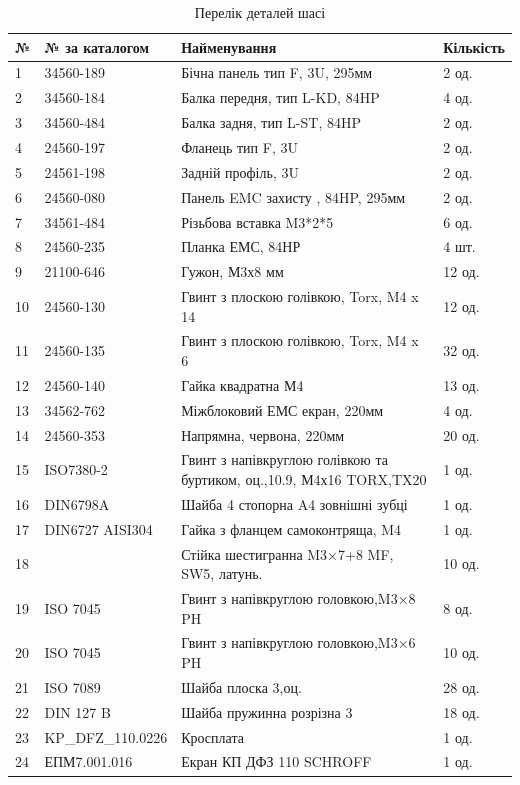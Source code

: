\begin{table}[H]
    \centering
  \caption{Перелік деталей шасі}
    \begin{tabular}{|p{0.8cm}|p{3.2cm}|p{7.5cm}|p{2cm}|} 
        \hline
        \textbf{№} & \textbf{№ за каталогом} & \textbf{Найменування} & \textbf{Кількість} \\ \hline
        1 & 34560-189 & Бічна панель тип F, 3U, 295мм  & 2 од. \\ \hline
        2 & 34560-184 & Балка передня, тип L-KD, 84HP & 4 од. \\ \hline
        3 & 34560-484 & Балка задня, тип L-ST, 84HP & 2 од. \\ \hline
        4 & 24560-197 & Фланець тип F, 3U & 2 од. \\ \hline
        5 & 24561-198 & Задній профіль, 3U & 2 од. \\ \hline
        6 & 24560-080 & Панель EMC захисту , 84HP, 295мм & 2 од. \\ \hline
        7 & 34561-484 & Різьбова вставка M3*2*5 & 6 од. \\ \hline
        8 & 24560-235 & Планка ЕМС, 84НР & 4 шт. \\ \hline
        9 & 21100-646 & Гужон, М3х8 мм & 12 од. \\ \hline
       10 & 24560-130 & Гвинт з плоскою голівкою, Torx, M4 x 14 & 12 од. \\ \hline
       11 & 24560-135 & Гвинт з плоскою голівкою, Torx, M4 x 6 & 32 од. \\ \hline
       12 & 24560-140 & Гайка квадратна М4 & 13 од. \\ \hline
       13 & 34562-762 & Міжблоковий ЕМС екран, 220мм & 4 од. \\ \hline
       14 & 24560-353 & Напрямна, червона, 220мм & 20 од. \\ \hline
       15 & ISO7380-2 & Гвинт з напівкруглою голівкою та буртиком, оц.,10.9, М4х16 TORX,TX20 & 1 од. \\ \hline
       16 & DIN6798A & Шайба 4 стопорна A4 зовнішні зубці & 1 од. \\ \hline
       17 & DIN6727 AISI304 & Гайка з фланцем самоконтряща, M4 & 1 од. \\ \hline
       18 &  & Стійка шестигранна M3×7+8 MF, SW5, латунь. & 10 од. \\ \hline
       19 & ISO 7045 & Гвинт з напівкруглою головкою,M3×8 PH & 8 од. \\ \hline
       20 & ISO 7045 & Гвинт з напівкруглою головкою,M3×6 PH & 10 од. \\ \hline
       21 & ISO 7089 & Шайба плоска 3,оц. & 28 од. \\ \hline
       22 & DIN 127 B & Шайба пружинна розрізна 3 & 18 од. \\ \hline
       23 & KP_DFZ_110.0226 & Кросплата & 1 од. \\ \hline
       24 & ЕПМ7.001.016 & Екран КП ДФЗ 110 SCHROFF & 1 од. \\ \hline
   
    \end{tabular}
    
\end{table}

